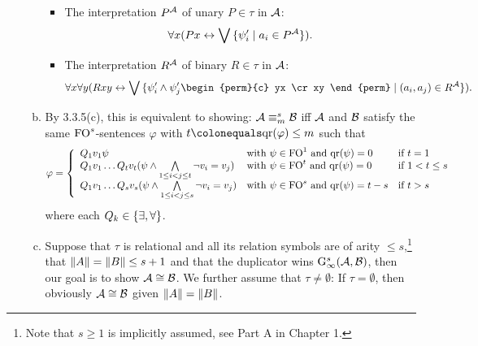 \begin{enumerate}[1.]
\begin{enumerate}[(a)]
\begin{itemize}
\[\]
\item The interpretation $P^{\mathcal{A}}$ of unary $P \in \tau$ in $\mathcal{A}$:
\[
\forall x (Px \leftrightarrow \bigvee {\{\psi'_i \mid a_i \in P^{\mathcal{A}}\}}).
\]
\item The interpretation $R^{\mathcal{A}}$ of binary $R \in \tau$ in $\mathcal{A}$:
\[
\forall x \forall y (Rxy \liff \blor \setm{\psi'_i \land \psi'_j\begin{perm}{c} yx \cr xy \end{perm}}{(a_i, a_j) \in \intpr{R}{\strct{A}}}).
\]
\end{itemize}
\item By 3.3.5(c), this is equivalent to showing: $\mathcal{A} \equiv^s_m \mathcal{B}$ iff $\mathcal{A}$ and $\mathcal{B}$ satisfy the same $\folog[s]$-sentences $\varphi$ with $t \defas \qr(\varphi) \leq m$ such that
\[
\varphi = \left\lbrace
\begin{array}{lll}
Q_1v_1 \psi & \mbox{with \mathmode{\psi \in \folog[1]} and \mathmode{\qr(\psi) = 0}} & \mbox{if \mathmode{t = 1}} \cr
Q_1v_1 \etc Q_tv_t(\psi \land \bland\limits_{1 \leq i < j \leq t} \neg v_i = v_j) & \mbox{with \mathmode{\psi \in \folog[t]} and \mathmode{\qr(\psi) = 0}} & \mbox{if \mathmode{1 < t \leq s}} \cr
Q_1v_1 \etc Q_sv_s(\psi \land \bland\limits_{1 \leq i < j \leq s} \neg v_i = v_j) & \mbox{with \mathmode{\psi \in \folog[s]} and \mathmode{\qr(\psi) = t - s}} & \mbox{if \mathmode{t > s}} \cr
\end{array}\right.
\]
where each $Q_k \in {\{\exists, \forall\}}$.
\item Suppose that $\tau$ is relational and all its relation symbols are of arity $\leq s$,\footnote{Note that $s \geq 1$ is implicitly assumed, see Part A in Chapter 1.} that $\|A\| = \|B\| \leq s + 1$ and that the duplicator wins $\game[s]{\infty}(\strct{A}, \strct{B})$, then our goal is to show $\mathcal{A} \cong \mathcal{B}$. We further assume that $\tau \neq \emptyset$: If $\tau = \emptyset$, then obviously $\mathcal{A} \cong \mathcal{B}$ given $\|A\| = \|B\|$.


\end{enumerate}
\end{enumerate}
